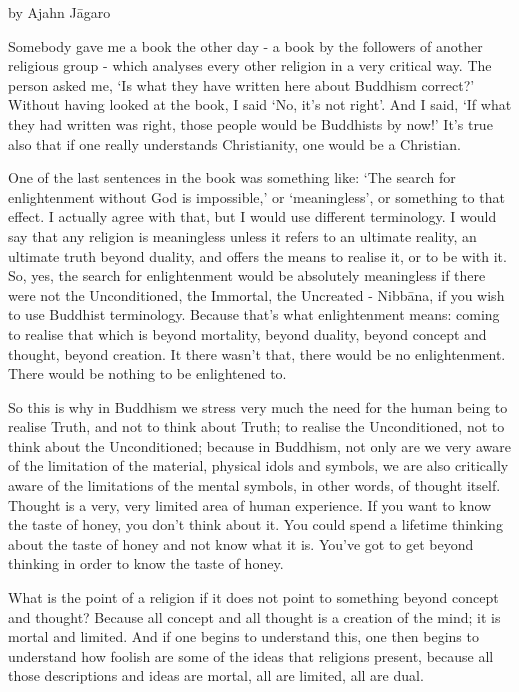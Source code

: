 by Ajahn Jāgaro

Somebody gave me a book the other day - a book by the followers of another religious group - which analyses every other religion in a very critical way. The person asked me, ‘Is what they have written here about Buddhism correct?’ Without having looked at the book, I said ‘No, it's not right’. And I said, ‘If what they had written was right, those people would be Buddhists by now!’ It's true also that if one really understands Christianity, one would be a Christian.

One of the last sentences in the book was something like: ‘The search for enlightenment without God is impossible,’ or ‘meaningless’, or something to that effect. I actually agree with that, but I would use different terminology. I would say that any religion is meaningless unless it refers to an ultimate reality, an ultimate truth beyond duality, and offers the means to realise it, or to be with it. So, yes, the search for enlightenment would be absolutely meaningless if there were not the Unconditioned, the Immortal, the Uncreated - Nibbāna, if you wish to use Buddhist terminology. Because that's what enlightenment means: coming to realise that which is beyond mortality, beyond duality, beyond concept and thought, beyond creation. It there wasn't that, there would be no enlightenment. There would be nothing to be enlightened to.

So this is why in Buddhism we stress very much the need for the human being to realise Truth, and not to think about Truth; to realise the Unconditioned, not to think about the Unconditioned; because in Buddhism, not only are we very aware of the limitation of the material, physical idols and symbols, we are also critically aware of the limitations of the mental symbols, in other words, of thought itself. Thought is a very, very limited area of human experience. If you want to know the taste of honey, you don't think about it. You could spend a lifetime thinking about the taste of honey and not know what it is. You've got to get beyond thinking in order to know the taste of honey.

What is the point of a religion if it does not point to something beyond concept and thought? Because all concept and all thought is a creation of the mind; it is mortal and limited. And if one begins to understand this, one then begins to understand how foolish are some of the ideas that religions present, because all those descriptions and ideas are mortal, all are limited, all are dual.

